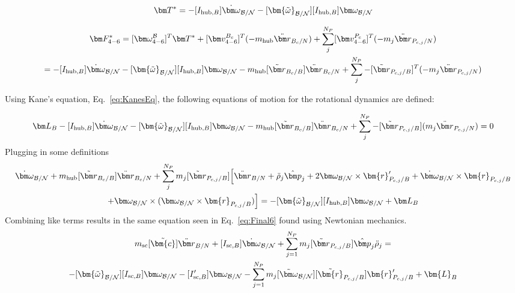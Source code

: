\begin{equation}
	\bm T^* = -[I_{\text{hub},B}] \dot{\bm\omega}_{\cal B/N}  -[\bm{\tilde{\omega}}_{\cal B/N}] [I_{\text{hub},B}] \bm\omega_{\cal B/N}
\end{equation}

\begin{multline}
	\bm F^*_{4-6} = [\bm \omega_{4-6}^{\cal{B}}]^T \bm T^* + [\bm v^{B_c}_{4-6}]^T (-m_{\text{hub}} \ddot{\bm r}_{B_c/N}) + \sum\limits_{j}^{N_P}[\bm v^{P_c}_{4-6}]^T (-m_j \ddot{\bm r}_{P_{c,j}/N}) \\
	= -[I_{\text{hub},B}] \dot{\bm\omega}_{\cal B/N}  -[\bm{\tilde{\omega}}_{\cal B/N}] [I_{\text{hub},B}] \bm\omega_{\cal B/N} - m_{\text{hub}} [\tilde{{\bm r}}_{B_c/B}] \ddot{\bm r}_{B_c/N}  + \sum\limits_{j}^{N_P}- [\tilde{{\bm r}}_{P_{c,j}/B}]^T (-m_j \ddot{\bm r}_{P_{c,j}/N})
\end{multline}

Using Kane's equation, Eq.~\eqref{eq:KanesEq}, the following equations of motion for the rotational dynamics are defined:

\begin{equation}
	\bm L_B  -[I_{\text{hub},B}] \dot{\bm\omega}_{\cal B/N}  -[\bm{\tilde{\omega}}_{\cal B/N}] [I_{\text{hub},B}] \bm\omega_{\cal B/N} -  m_{\text{hub}} [\tilde{{\bm r}}_{B_c/B}] \ddot{\bm r}_{B_c/N}  + \sum\limits_{j}^{N_P}- [\tilde{{\bm r}}_{P_{c,j}/B}] (m_j \ddot{\bm r}_{P_{c,j}/N}) = 0
\end{equation}
Plugging in some definitions
\begin{multline}
	[I_{\text{hub},B}] \dot{\bm\omega}_{\cal B/N}  + m_{\text{hub}} [\tilde{{\bm r}}_{B_c/B}] \ddot{\bm r}_{B_c/N}  + \sum\limits_{j}^{N_P} m_j [\tilde{{\bm r}}_{P_{c,j}/B}] \Big[\ddot{\bm r}_{B/N} + \ddot{\rho}_j \hat{\bm p}_j  +2 \bm\omega_{\cal B/N} \times \bm{r}'_{P_{c,j}/B} + \dot{\bm\omega}_{\cal B/N} \times \bm{r}_{P_{c,j}/B}  \\
	+\bm\omega_{\cal B/N} \times (\bm\omega_{\cal B/N} \times \bm{r}_{P_{c,j}/B})\Big] = -[\bm{\tilde{\omega}}_{\cal B/N}] [I_{\text{hub},B}] \bm\omega_{\cal B/N} + \bm L_B
\end{multline}
Combining like terms results in the same equation seen in Eq.~\eqref{eq:Final6} found using Newtonian mechanics.
\begin{multline}
	m_{\text{sc}}[\tilde{\bm{c}}]\ddot{\bm r}_{B/N}+[I_{\text{sc},B}] \dot{\bm\omega}_{\cal B/N} + \sum\limits_{j=1}^{N_P}m_j [\tilde{\bm r}_{P_{c,j}/B}] \hat{\bm p}_j \ddot{\rho}_j = \\
	-[\bm{\tilde{\omega}}_{\cal B/N}] [I_{\text{sc},B}] \bm\omega_{\cal B/N}
	- [I'_{\text{sc},B}] \bm\omega_{\cal B/N} 	- \sum\limits_{j=1}^{N_P} m_j [\tilde{\bm\omega}_{\cal B/N}] [\tilde{\bm{r}}_{P_{c,j}/B}] \bm{r}'_{P_{c,j}/B} + \bm{L}_B
	\label{eq:Final7}
\end{multline}

